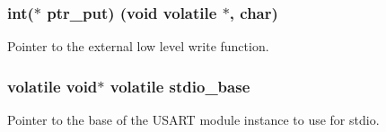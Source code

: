 \subsubsection[{ptr\+\_\+put}]{\setlength{\rightskip}{0pt plus 5cm}int($\ast$ ptr\+\_\+put) (void volatile $\ast$, char)}\label{group__group__common__utils__stdio__stdio__serial_gab88750c764f1e24b95134201373aba70}
Pointer to the external low level write function. \hypertarget{group__group__common__utils__stdio__stdio__serial_gad4163ee0eaa09db3b42c367fd768e737}{}
\subsubsection[{stdio\+\_\+base}]{\setlength{\rightskip}{0pt plus 5cm}volatile void$\ast$ volatile stdio\+\_\+base}\label{group__group__common__utils__stdio__stdio__serial_gad4163ee0eaa09db3b42c367fd768e737}
Pointer to the base of the U\+S\+A\+R\+T module instance to use for stdio. 